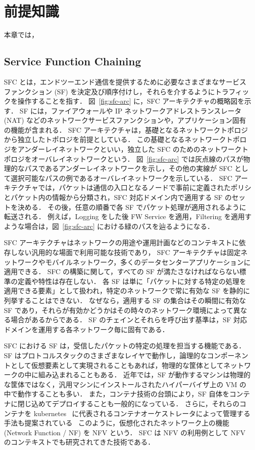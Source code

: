 \chapter{前提知識}
\label{chap:prerequisite-knowledgement}
本章では，
\section{Service Function Chaining}
\label{section:sfc}

SFC とは，エンドツーエンド通信を提供するために必要なさまざまなサービスファンクション (SF) を決定及び順序付けし，それらを介するようにトラフィックを操作することを指す．
図~\ref{fig:sfc-arc} に，SFC アーキテクチャの概略図を示す．
SF には，ファイアウォールや IP ネットワークアドレストランスレータ (NAT) などのネットワークサービスファンクションや，アプリケーション固有の機能が含まれる．
SFC アーキテクチャは，基礎となるネットワークトポロジから独立したトポロジを前提としている．
この基礎となるネットワークトポロジをアンダーレイネットワークといい，独立した SFC のためのネットワークトポロジをオーバレイネットワークという．
図~\ref{fig:sfc-arc} では灰点線のパスが物理的なパスであるアンダーレイネットワークを示し，その他の実線が SFC として選択可能なパスの例であるオーバレイネットワークを示している．
SFC アーキテクチャでは，パケットは通信の入口となるノードで事前に定義されたポリシとパケット内の情報から分類され，SFC 対応ドメイン内で適用する SF のセットを決める．
その後，任意の順番で各 SF でパケット処理が適用されるように転送される．
例えば，Logging をした後 FW Service を適用，Filtering を適用すような場合は，図~\ref{fig:sfc-arc} における緑のパスを辿るようになる．

SFC アーキテクチャはネットワークの用途や運用計画などのコンテキストに依存しない汎用的な場面で利用可能な技術であり，
SFC アーキテクチャは固定ネットワークやモバイルネットワーク，多くのデータセンターアプリケーションに適用できる．
SFC の構築に関して，すべての SF が満たさなければならない標準の定義や特性は存在しない．
各 SF は単に「パケットに対する特定の処理を適用できる要素」として扱われ，特定のネットワークで常に有効な SF を静的に列挙することはできない．
なぜなら，適用する SF の集合はその瞬間に有効な SF であり，それらが有効かどうかはその時々のネットワーク環境によって異なる場合があるからである．
SF のチェインとそれらを呼び出す基準は，SF 対応ドメインを運用する各ネットワーク毎に固有である．

SFC における SF は，受信したパケットの特定の処理を担当する機能である．
SF はプロトコルスタックのさまざまなレイヤで動作し，論理的なコンポーネントとして仮想要素として実現されることもあれば，物理的な筐体としてネットワークの中に組み込まれることもある．
近年では，SF が動作するマシンは物理的な筐体ではなく，汎用マシンにインストールされたハイパーバイザ上の VM の中で動作することも多い．
また，コンテナ技術の台頭により，SF 自体をコンテナに閉じ込めてデプロイすることも一般的になっている．
さらに，それらのコンテナを kubernetes~\cite{k8s} に代表されるコンテナオーケストレータによって管理する手法も提案されている~\cite{sfc-with-k8s}
このように，仮想化されたネットワーク上の機能 (Network Function / NF) を NFV という．
SFC は NFV の利用例として NFV のコンテキストでも研究されてきた技術である．

